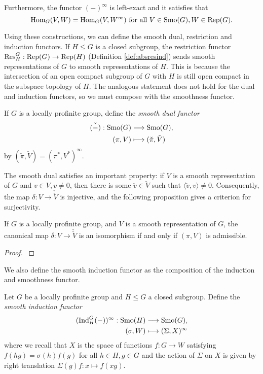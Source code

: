 Furthermore, the functor $(-)^\infty$ is left-exact and it satisfies that
$$\mathrm{Hom}_G(V,W)=\mathrm{Hom}_G(V,W^\infty) \text{ for all } V\in\mathrm{Smo}(G), W\in\mathrm{Rep}(G).$$

Using these constructions, we can define the smooth dual, restriction and induction functors. If $H\leq G$ is a closed subgroup, the restriction functor $\mathrm{Res}_H^G:\mathrm{Rep}(G)\to\mathrm{Rep}(H)$ (Definition \ref{def:absresind}) sends smooth representations of $G$ to smooth representations of $H$. This is because the intersection of an open compact subgroup of $G$ with $H$ is still open compact in the subspace topology of $H$. The analogous statement does not hold for the dual and induction functors, so we must compose with the smoothness functor. 

\begin{defn}
    If $G$ is a locally profinite group, define the \textit{smooth dual functor} 
    \begin{align*}
        \check{(-)}:\mathrm{Smo}(G)&\longrightarrow\mathrm{Smo}(G),\\
        (\pi,V)&\longmapsto(\check{\pi},\check{V})
    \end{align*}
    by $(\check{\pi},\check{V})=(\pi^*,V^*)^\infty$.
\end{defn}

The smooth dual satisfies an important property: if $V$ is a smooth representation of $G$ and $v\in V, v\neq 0$, then there is some $\check{v}\in\check{V}$ such that $\langle\check{v},v\rangle\neq 0$. Consequently, the map $\delta:V\rightarrow\check{\check{V}}$ is injective, and the following proposition gives a criterion for surjectivity.

\begin{prop}
    If $G$ is a locally profinite group, and $V$ is a smooth representation of $G$, the canonical map $\delta:V\longrightarrow\check{\check{V}}$ is an isomorphism if and only if $(\pi,V)$ is admissible.
\end{prop}
\begin{proof}
    \cite[Proposition 2.9]{BH1}
\end{proof}

We also define the smooth induction functor as the composition of the induction and smoothness functor.

\begin{defn}\label{induction}
    Let $G$ be a locally profinite group and $H\leq G$ a closed subgroup. Define the \textit{smooth induction functor}
    \begin{align*}
        (\mathrm{Ind}_H^G(-))^\infty:\mathrm{Smo}(H)&\longrightarrow\mathrm{Smo}(G),\\
        (\sigma,W)&\longmapsto(\Sigma,X)^\infty
    \end{align*}
    where we recall that $X$ is the space of functions $f: G\to W$ satisfying $f(hg) = \sigma(h)f(g)$ for all $h\in H, g\in G$ and the action of $\Sigma$ on $X$ is given by right translation $\Sigma(g)f:x\mapsto f(xg)$.
\end{defn}

